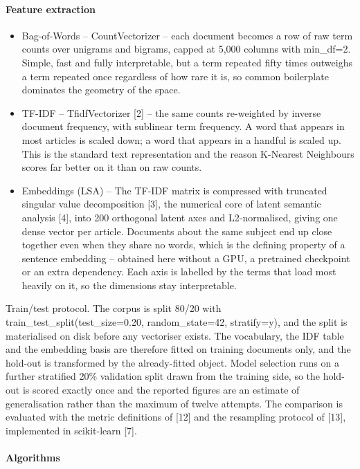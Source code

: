 \documentclass[conference,a4paper]{IEEEtran}
\begin{document}
\paragraph{Feature extraction}

\begin{itemize}
  \item Bag-of-Words -- CountVectorizer -- each document becomes a row of raw term counts over unigrams and bigrams, capped at 5,000 columns with min\_df=2. Simple, fast and fully interpretable, but a term repeated fifty times outweighs a term repeated once regardless of how rare it is, so common boilerplate dominates the geometry of the space.
  \item TF-IDF -- TfidfVectorizer [2] -- the same counts re-weighted by inverse document frequency, with sublinear term frequency. A word that appears in most articles is scaled down; a word that appears in a handful is scaled up. This is the standard text representation and the reason K-Nearest Neighbours scores far better on it than on raw counts.
  \item Embeddings (LSA) -- The TF-IDF matrix is compressed with truncated singular value decomposition [3], the numerical core of latent semantic analysis [4], into 200 orthogonal latent axes and L2-normalised, giving one dense vector per article. Documents about the same subject end up close together even when they share no words, which is the defining property of a sentence embedding -- obtained here without a GPU, a pretrained checkpoint or an extra dependency. Each axis is labelled by the terms that load most heavily on it, so the dimensions stay interpretable.
\end{itemize}

Train/test protocol. The corpus is split 80/20 with train\_test\_split(test\_size=0.20, random\_state=42, stratify=y), and the split is materialised on disk before any vectoriser exists. The vocabulary, the IDF table and the embedding basis are therefore fitted on training documents only, and the hold-out is transformed by the already-fitted object. Model selection runs on a further stratified 20\% validation split drawn from the training side, so the hold-out is scored exactly once and the reported figures are an estimate of generalisation rather than the maximum of twelve attempts. The comparison is evaluated with the metric definitions of [12] and the resampling protocol of [13], implemented in scikit-learn [7].

\paragraph{Algorithms}
\end{document}
